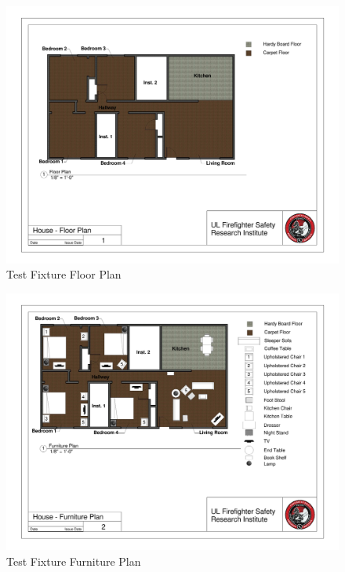 \begin{figure}
\includegraphics[width=\textheight]{../0_Images/Appendix_Figures/Floor_Plan}
\caption[]{Test Fixture Floor Plan}
\label{fig:appendix_floorplan}
\end{figure}

\begin{figure}
\includegraphics[width=\textheight]{../0_Images/Appendix_Figures/Furniture_Plan}
\caption[]{Test Fixture Furniture Plan}
\label{fig:appendix_furnitureplan}
\end{figure}

